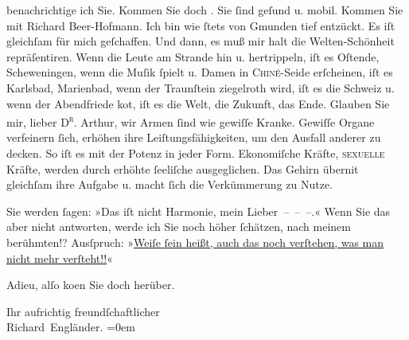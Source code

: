                benachrichtige ich Sie. Kommen Sie doch \label{K_L00468-2v}\label{K_L00468-2}. Sie{ }ſind geſund u. mobil. Kommen Sie mit Richard Beer-Hofmann. Ich bin wie{ }ſtets von Gmunden tief entzückt. Es iſt gleichſam für {\pb}mich geſchaffen. Und dann, es muß mir halt
               die Welten-Schönheit  repräſentiren. Wenn die Leute
               am Strande hin u. hertrippeln, iſt es Oſtende,
                  Sch\introOben{}e\introOben{}weningen, wenn
               die Muſik{ }ſpielt u. Damen in \textsc{Chiné}-Seide erſcheinen, iſt es
               Karlsbad, Marienbad, wenn der Traunſtein ziegelroth wird, iſt es
               die Schweiz u. wenn der Abendfriede ko{\geminationm}t, iſt  es die  Welt, die Zukunft, \introOben{}das Ende.\introOben{}
               Glauben Sie mir, lieber \textsc{D\textsuperscript{r}}. Arthur, wir Armen{ }ſind wie gewiſſe {\pb}Kranke. Gewiſſe Organe verfeinern{ }ſich, erhöhen ihre Leiſtungsfähigkeiten, um den
               Ausfall anderer zu decken. So iſt es mit der Potenz in jeder Form. Ekonomiſche
               Kräfte, \textsc{sexuelle} Kräfte, werden durch erhöhte{ }ſeeliſche
               ausgeglichen. Das Gehirn überni{\geminationm}t gleichſam ihre Aufgabe
               u. macht{ }ſich die Verkümmerung zu Nutze.\pend
           
\pstart
           Sie werden{ }ſagen: »Das iſt nicht Harmonie, mein Lieber – – –.« {\pb}Wenn Sie das aber nicht antworten, werde
               ich Sie noch höher{ }ſchätzen, nach meinem berühmten\introOben{}!?\introOben{}
               Ausſpruch: »\uline{Weiſe{ }ſein heißt,  auch das noch verſtehen, was man nicht mehr verſteht!!}«\pend
           
\pstart
           Adieu, alſo ko{\geminationm}en Sie doch herüber.\pend
           
\pstart
           Ihr aufrichtig freundſchaftlicher{\\[\baselineskip]}\spacefill\mbox{Richard Engländer.}\pend
           \leftskip=0em{}\endnumbering{}  \newcommand{\dateiname}{L00468}\newcommand{\titel}{Peter Altenberg an Arthur Schnitzler, [30. 7. 1895]}\newcommand{\editorInnen}{Martin Anton Müller und Gerd-Hermann Susen}
